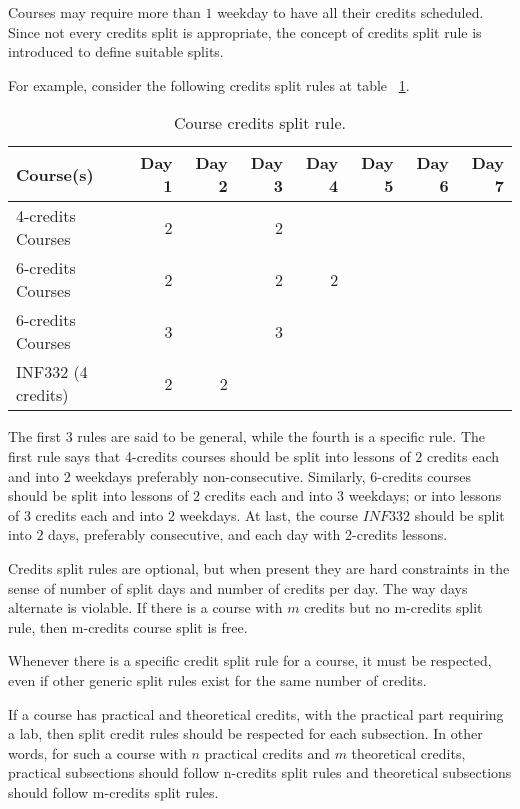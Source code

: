 Courses may require more than $1$ weekday to have all their credits scheduled. Since not every credits split is appropriate, the concept of credits split rule is introduced to define suitable splits.

For example, consider the following credits split rules at table ~\ref{tab:split}.

\begin{table}[H]
\centering
\begin{tabular}{l|r|r|r|r|r|r|r}
Course(s) & Day 1 & Day 2 & Day 3 & Day 4 & Day 5 & Day 6 & Day 7 \\\hline
4-credits Courses & 2 & & 2 & & & & \\
6-credits Courses & 2 & & 2 & 2 & & & \\
6-credits Courses & 3 & & 3 & & & & \\
INF332 (4 credits) & 2 & 2 & & & & & \\
\end{tabular}
\caption{\label{tab:split}Course credits split rule.}
\end{table}

The first $3$ rules are said to be general, while the fourth is a specific rule. The first rule says that 4-credits courses should be split into lessons of $2$ credits each and into $2$ weekdays preferably non-consecutive. Similarly, 6-credits courses should be split into lessons of $2$ credits each and into $3$ weekdays; or into lessons of $3$ credits each and into $2$ weekdays. At last, the course $INF332$ should be split into $2$ days, preferably consecutive, and each day with 2-credits lessons.

Credits split rules are optional, but when present they are hard constraints in the sense of number of split days and number of credits per day. The way days alternate is violable. If there is a course with $m$ credits but no m-credits split rule, then m-credits course split is free.

Whenever there is a specific credit split rule for a course, it must be respected, even if other generic split rules exist for the same number of credits.

If a course has practical and theoretical credits, with the practical part requiring a lab, then split credit rules should be respected for each subsection. In other words, for such a course with $n$ practical credits and $m$ theoretical credits, practical subsections should follow n-credits split rules and theoretical subsections should follow m-credits split rules.


